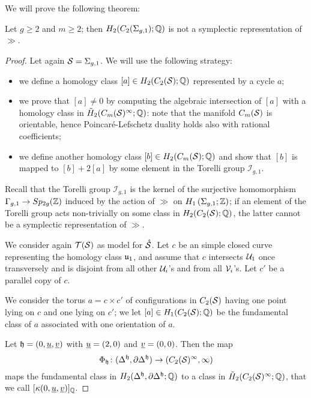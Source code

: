 We will prove the following theorem:
\begin{thm}
 \label{thm:counterexample}
 Let $g\geq 2$ and $m\geq 2$; then $H_2(C_2(\Sigma_{g,1});\Q)$ is not a symplectic
 representation of $\gg$.
\end{thm}
\begin{proof}
 Let again $\S=\Sigma_{g,1}$. We will use the following strategy:
 \begin{itemize}
  \item we define a homology class $[a]\in H_2(C_2(\S);\Q)$ represented by a cycle $a$;
  \item we prove that $[a]\neq 0$ by computing the algebraic intersection of
  $[a]$ with a homology class
  in $\tH_2(\cms^{\infty};\Q)$: note that the manifold
  $\cms$ is orientable, hence Poincaré-Lefschetz duality holds
  also with rational coefficients;
  \item we define another homology class $[b]\in H_2(\cms;\Q)$ and show that
  $[b]$ is mapped to $[b]+2[a]$ by some element in the Torelli group $\mathcal{I}_{g,1}$.
 \end{itemize}
Recall that the Torelli group $\mathcal{I}_{g,1}$ is the kernel of the surjective homomorphism
$\gg\to Sp_{2g}(\Z)$ induced by the action of $\gg$ on $H_1\pa{\sg;\Z}$; if an element of the Torelli group acts non-trivially on
some class in $H_2(C_2(\S);\Q)$, the latter cannot be a symplectic representation of $\gg$.

We consider again $\T(\S)$ as model for $\mrS$. Let $c$ be an simple closed curve
representing the homology class $\u_1$, and assume that $c$ intersects $\U_1$ once
transversely and is disjoint from all other $\U_i$'s and from all $\V_i$'s. Let $c'$
be a parallel copy of $c$.

We consider the torus $a=c\times c'$ of configurations in $C_2(\S)$ having one point lying on $c$ and
one lying on $c'$; we let $[a]\in H_1(C_2(\S);\Q)$ be the fundamental class of $a$ associated with one
orientation of $a$.

Let $\tup=(0,\uu,\uv)$ with $\uu=(2,0)$ and $\uv=(0,0)$.
Then the map
\[
\Phi_{\tup}\colon (\Delta^{\tup},\partial\Delta^{\tup})\to (C_2(\S)^{\infty},\infty)
\]
maps the fundamental class in $H_2(\Delta^{\tup},\partial\Delta^{\tup};\Q)$ to a
class in $\tH_2(C_2(\S)^{\infty};\Q)$, that we call $[\kappa(0,\uu,\uv)]_{\Q}$.


\end{proof}
